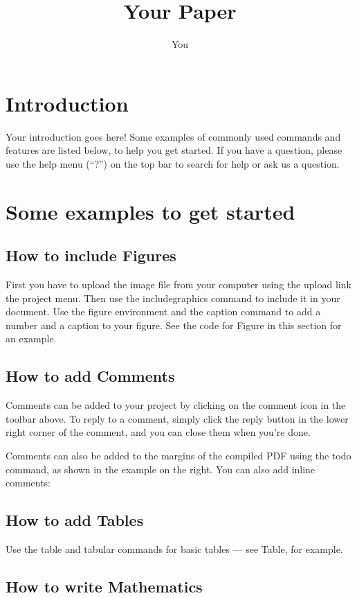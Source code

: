 \documentclass[a4paper]{article}
\title{Your Paper}
\author{You}
\begin{document}
\section{Introduction}

Your introduction goes here! Some examples of commonly used commands and features are listed below, to help you get started. If you have a question, please use the help menu (``?'') on the top bar to search for help or ask us a question. 

\section{Some examples to get started}

\subsection{How to include Figures}

First you have to upload the image file from your computer using the upload link the project menu. Then use the includegraphics command to include it in your document. Use the figure environment and the caption command to add a number and a caption to your figure. See the code for Figure in this section for an example.

\subsection{How to add Comments}

Comments can be added to your project by clicking on the comment icon in the toolbar above. 
To reply to a comment, simply click the reply button in the lower right corner of the comment, and you can close them when you're done.

Comments can also be added to the margins of the compiled PDF using the todo command, as shown in the example on the right. You can also add inline comments:

\subsection{How to add Tables}

Use the table and tabular commands for basic tables --- see Table, for example. 

\subsection{How to write Mathematics}
\end{document}
